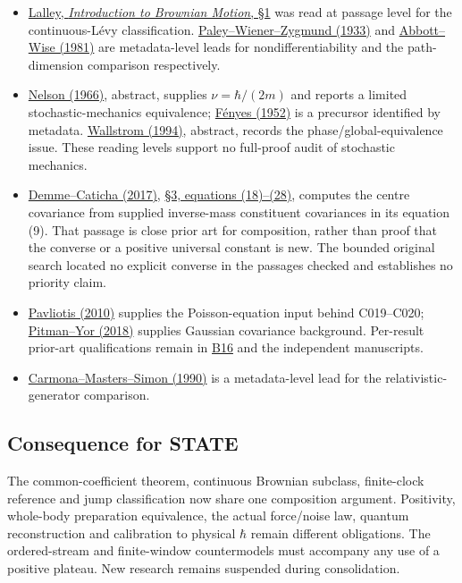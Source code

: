 \documentclass[11pt,a4paper]{article}
\newcommand{\tightlist}{\setlength{\itemsep}{0pt}\setlength{\parskip}{0pt}}
\begin{document}
\begin{itemize}
\tightlist
\item
  \href{https://galton.uchicago.edu/~lalley/Courses/383/BrownianMotion.pdf}{Lalley,
  \emph{Introduction to Brownian Motion}, §1} was read at passage level
  for the continuous-Lévy classification.
  \href{https://doi.org/10.1007/BF01474606}{Paley--Wiener--Zygmund
  (1933)} and \href{https://doi.org/10.1119/1.12657}{Abbott--Wise
  (1981)} are metadata-level leads for nondifferentiability and the
  path-dimension comparison respectively.
\item
  \href{https://doi.org/10.1103/PhysRev.150.1079}{Nelson (1966)},
  abstract, supplies \(\nu=\hbar/(2m)\) and reports a limited
  stochastic-mechanics equivalence;
  \href{https://doi.org/10.1007/BF01338578}{Fényes (1952)} is a
  precursor identified by metadata.
  \href{https://doi.org/10.1103/PhysRevA.49.1613}{Wallstrom (1994)},
  abstract, records the phase/global-equivalence issue. These reading
  levels support no full-proof audit of stochastic mechanics.
\item
  \href{https://doi.org/10.1063/1.4985370}{Demme--Caticha (2017)},
  \href{https://arxiv.org/pdf/1612.01905}{§3, equations (18)--(28)},
  computes the centre covariance from supplied inverse-mass constituent
  covariances in its equation (9). That passage is close prior art for
  composition, rather than proof that the converse or a positive
  universal constant is new. The bounded original search located no
  explicit converse in the passages checked and establishes no priority
  claim.
\item
  \href{https://arxiv.org/abs/1002.4103v1}{Pavliotis (2010)} supplies
  the Poisson-equation input behind C019--C020;
  \href{https://arxiv.org/abs/1802.09679v1}{Pitman--Yor (2018)} supplies
  Gaussian covariance background. Per-result prior-art qualifications
  remain in \href{../references/batches/B16.md}{B16} and the independent
  manuscripts.
\item
  \href{https://doi.org/10.1016/0022-1236(90)90049-Q}{Carmona--Masters--Simon
  (1990)} is a metadata-level lead for the relativistic-generator
  comparison.
\end{itemize}

\hypertarget{consequence-for-state}{%
\subsection{Consequence for STATE}\label{consequence-for-state}}

The common-coefficient theorem, continuous Brownian subclass,
finite-clock reference and jump classification now share one composition
argument. Positivity, whole-body preparation equivalence, the actual
force/noise law, quantum reconstruction and calibration to physical
\(\hbar\) remain different obligations. The ordered-stream and
finite-window countermodels must accompany any use of a positive
plateau. New research remains suspended during consolidation.
\end{document}
